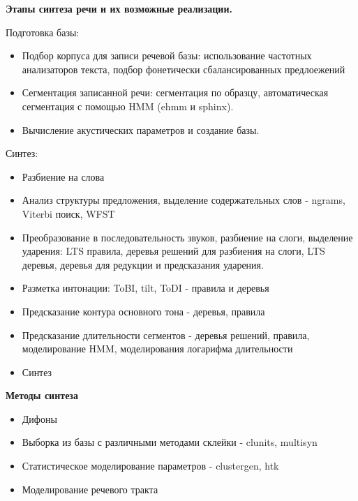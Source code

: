 \documentclass{seminar}
\begin{document}
\begin{slide}
{\bf Этапы синтеза речи и их возможные реализации.}

Подготовка базы:
\begin{itemize}
\item Подбор корпуса для записи речевой базы: использование
      частотных анализаторов текста, подбор фонетически сбалансированных
      предлоежений
\item Сегментация записанной речи: сегментация по образцу, автоматическая
      сегментация с помощью HMM (ehmm и sphinx).
\item Вычисление акустических параметров и создание базы. 
\end{itemize}

Синтез:
\begin{itemize}
\item Разбиение на слова
\item Анализ структуры предложения, выделение содержательных слов - ngrams, Viterbi поиск, WFST
\item Преобразование в последовательность звуков, разбиение на слоги, выделение
      ударения: LTS правила, деревья решений для разбиения на слоги, LTS деревья, 
      деревья для редукции и предсказания ударения.
\item Разметка интонации: ToBI, tilt, ToDI - правила и деревья
\item Предсказание контура основного тона - деревья, правила
\item Предсказание длительности сегментов - деревья решений, правила, моделирование HMM, моделирования логарифма длительности
\item Синтез
\end{itemize}

\end{slide}
\begin{slide}

{\bf Методы синтеза}

\begin{itemize}
\item Дифоны
\item Выборка из базы с различными методами склейки - clunits, multisyn
\item Статистическое моделирование параметров - clustergen, htk
\item Моделирование речевого тракта
\end{itemize}    

\end{slide}
\end{document}
